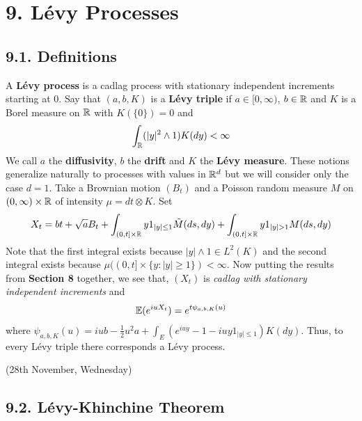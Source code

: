 \documentclass[12pt,a4paper]{report}
\begin{document}
\section*{9. L\'{e}vy Processes}

\subsection{9.1. Definitions}

A \textbf{L\'{e}vy process} is a cadlag process with stationary independent increments starting at 0. Say that $(a,b,K)$ is a \textbf{L\'{e}vy triple} if $a\in [0,\infty)$, $b\in \mathbb{R}$ and $K$ is a Borel measure on $\mathbb{R}$ with $K(\{0\}) =0$ and
\begin{align*}
\int_{\mathbb{R}} (|y|^2 \wedge 1) K(dy) < \infty
\end{align*}
We call $a$ the \textbf{diffusivity}, $b$ the \textbf{drift} and $K$ the \textbf{L\'{e}vy measure}. These notions generalize naturally to processes with values in $\mathbb{R}^d$ but we will consider only the case $d = 1$. Take a Brownian motion $(B_t)$ and a Poisson random measure $M$ on $(0,\infty) \times \mathbb{R}$ of intensity $\mu = dt \otimes K$. Set
\begin{align*}
X_t = bt + \sqrt{a} B_t +\int_{(0,t]\times \reals} y1_{|y| \leq 1} \tilde{M}(ds,dy) + \int_{(0,t] \times \reals} y1_{|y|>1} M(ds,dy)
\end{align*}
Note that the first integral exists because $|y|\wedge 1 \in L^2(K)$ and the second integral exists because $\mu((0,t] \times \{y: |y|\geq 1\}   ) < \infty$. Now putting the results from \textbf{Section 8} together, we see that, $(X_t)$ is \emph{cadlag with stationary independent increments} and
\begin{align*}
\mathbb{E}(e^{iu X_t}) = e^{t\psi_{a,b,K}(u)}
\end{align*}
where $\psi_{a,b,K}(u) = iub - \frac{1}{2}u^2a  + \int_E (e^{iuy} - 1 - iuy1_{|y|\leq 1}) K(dy)$. Thus, to every L\'{e}vy triple there corresponds a L\'{e}vy process.
\s

\newday

(28th November, Wednesday)

\subsection*{9.2. L\'{e}vy-Khinchine Theorem}
\end{document}
